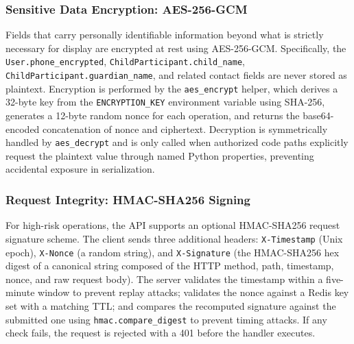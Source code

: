 \documentclass[11pt]{article}
\begin{document}
\subsubsection{Sensitive Data Encryption: AES-256-GCM}
Fields that carry personally identifiable information beyond what is strictly necessary for display are encrypted at rest using AES-256-GCM. Specifically, the \texttt{User.phone\_encrypted}, \texttt{ChildParticipant.child\_name}, \texttt{ChildParticipant.guardian\_name}, and related contact fields are never stored as plaintext. Encryption is performed by the \texttt{aes\_encrypt} helper, which derives a 32-byte key from the \texttt{ENCRYPTION\_KEY} environment variable using SHA-256, generates a 12-byte random nonce for each operation, and returns the base64-encoded concatenation of nonce and ciphertext. Decryption is symmetrically handled by \texttt{aes\_decrypt} and is only called when authorized code paths explicitly request the plaintext value through named Python properties, preventing accidental exposure in serialization.

\subsubsection{Request Integrity: HMAC-SHA256 Signing}
For high-risk operations, the API supports an optional HMAC-SHA256 request signature scheme. The client sends three additional headers: \texttt{X-Timestamp} (Unix epoch), \texttt{X-Nonce} (a random string), and \texttt{X-Signature} (the HMAC-SHA256 hex digest of a canonical string composed of the HTTP method, path, timestamp, nonce, and raw request body). The server validates the timestamp within a five-minute window to prevent replay attacks; validates the nonce against a Redis key set with a matching TTL; and compares the recomputed signature against the submitted one using \texttt{hmac.compare\_digest} to prevent timing attacks. If any check fails, the request is rejected with a 401 before the handler executes.
\end{document}
